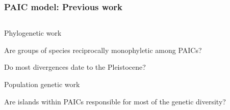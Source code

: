 \begin{frame}
    \frametitle{PAIC model: Previous work}
    \begin{columns}[c]
            \begin{myitemize}
            \item Phylogenetic work
                \begin{myitemize}
                \item Are groups of species reciprocally monophyletic among
                    PAICs?
                \item Do most divergences date to the Pleistocene?
                \end{myitemize}
            \item Population genetic work
                \begin{myitemize}
                \item Are islands within PAICs responsible for most of the
                    genetic diversity?
                \end{myitemize}
            \end{myitemize}


\end{columns}
\end{frame}
